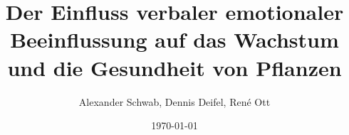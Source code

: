 \documentclass[11pt]{article}
\title{Der Einfluss verbaler emotionaler Beeinflussung auf das Wachstum und die Gesundheit von Pflanzen}
\author{Alexander Schwab, Dennis Deifel, René Ott}
\date{\today}
\begin{document}
    \renewcommand{\figurename}{Abb.}

    \maketitle
    \tableofcontents
    \pagebreak

    
    
    
    
    \printbibliography
\end{document}
